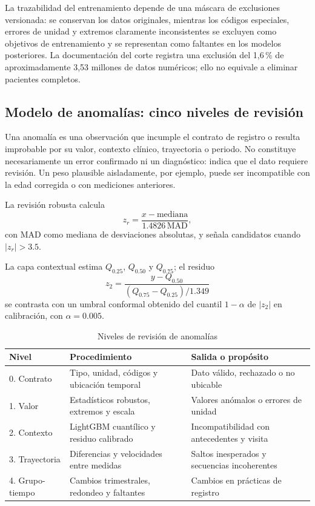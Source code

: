 \documentclass[conference,letterpaper]{IEEEtran}
\begin{document}
La trazabilidad del entrenamiento depende de una máscara de exclusiones versionada: se conservan los datos originales, mientras los códigos especiales, errores de unidad y extremos claramente inconsistentes se excluyen como objetivos de entrenamiento y se representan como faltantes en los modelos posteriores. La documentación del corte registra una exclusión del 1,6\,\% de aproximadamente 3,53 millones de datos numéricos; ello no equivale a eliminar pacientes completos.

\subsection{Modelo de anomalías: cinco niveles de revisión}

Una anomalía es una observación que incumple el contrato de registro o resulta improbable por su valor, contexto clínico, trayectoria o periodo. No constituye necesariamente un error confirmado ni un diagnóstico: indica que el dato requiere revisión. Un peso plausible aisladamente, por ejemplo, puede ser incompatible con la edad corregida o con mediciones anteriores.

La revisión robusta calcula
\begin{equation}
z_r=\frac{x-\mathrm{mediana}}{1.4826\,\mathrm{MAD}},
\end{equation}
con MAD como mediana de desviaciones absolutas, y señala candidatos cuando $|z_r|>3.5$.

La capa contextual estima $Q_{0.25}$, $Q_{0.50}$ y $Q_{0.75}$; el residuo
\begin{equation}
z_2=\frac{y-Q_{0.50}}{(Q_{0.75}-Q_{0.25})/1.349}
\end{equation}
se contrasta con un umbral conformal obtenido del cuantil $1-\alpha$ de $|z_2|$ en calibración, con $\alpha=0.005$.

\begin{table}[!t]
\caption{Niveles de revisión de anomalías}
\label{tab:anomalias}
\centering
\scriptsize
\begin{tabular}{p{} p{} p{}}
\toprule
Nivel & Procedimiento & Salida o propósito \\
\midrule
0. Contrato & Tipo, unidad, códigos y ubicación temporal & Dato válido, rechazado o no ubicable \\
1. Valor & Estadísticos robustos, extremos y escala & Valores anómalos o errores de unidad \\
2. Contexto & LightGBM cuantílico y residuo calibrado & Incompatibilidad con antecedentes y visita \\
3. Trayectoria & Diferencias y velocidades entre medidas & Saltos inesperados y secuencias incoherentes \\
4. Grupo-tiempo & Cambios trimestrales, redondeo y faltantes & Cambios en prácticas de registro \\
\bottomrule
\end{tabular}
\end{table}
\end{document}
